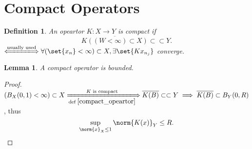\documentclass[a4paper]{book}
\newtheorem{defi}[thm]{Definition}
\newtheorem{lemma}[thm]{Lemma}
\newcommand\compact{\subset \subset}
\newcommand\xiff\xLongleftrightarrow
\newcommand\ximplies\xLongrightarrow
\DeclarePairedDelimiter{\norm}\lVert\rVert
\DeclarePairedDelimiter{\set}\lbrace\rbrace
\begin{document}
\section{Compact Operators}
\begin{defi}\label{compact_opeartor}
    An opeartor $K \colon X \to Y$ is compact if
    \begin{equation*}
        \overline{K((W < \infty) \subset X)} \compact Y.
    \end{equation*}
    $\xiff{\text{usually used}} \forall (\set{x_n} < \infty) \subset X, \exists \set{Kx_{n_j}}$ converge.
\end{defi}
\begin{lemma}
    A compact operator is bounded.
\end{lemma}
\begin{proof}
    $(B_X(0,1)<\infty) \subset X \ximplies[\text{def } \ref{compact_opeartor}]{K \text{ is compact}} \overline{K(B)} \compact{Y} \implies \overline{K(B)} \subset B_Y(0,R)$, thus
    \begin{equation*}
        \sup_{\norm{x}_X \leq 1}\norm{K(x)}_Y \leq R.
    \end{equation*}
\end{proof}
\end{document}
